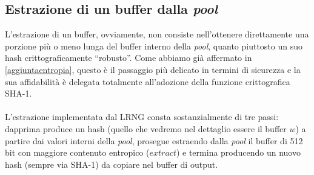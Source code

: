 \documentclass{article}
\begin{document}
 
 
 \subsection{Estrazione di un buffer dalla \emph{pool}}\label{estrazionebuffer}
 L'estrazione di un buffer, ovviamente, non consiste nell'ottenere
 direttamente una porzione più o meno lunga del buffer interno della
 \emph{pool}, quanto piuttosto un suo hash crittograficamente ``robusto''.
 Come abbiamo già affermato in \ref{aggiuntaentropia}, questo è il passaggio più
 delicato in termini di sicurezza e la sua affidabilità è delegata totalmente
 all'adozione della funzione crittografica SHA-1. 
 \paragraph{} L'estrazione implementata dal LRNG consta sostanzialmente di tre
 passi: dapprima produce un hash (quello che vedremo nel dettaglio essere il
 buffer $w$) a partire dai valori interni della \emph{pool}, prosegue estraendo
 dalla \emph{pool} il buffer di 512 bit con maggiore contenuto entropico
 ($extract$) e termina producendo un nuovo hash (sempre via SHA-1) da copiare
 nel buffer di output.
\end{document}
